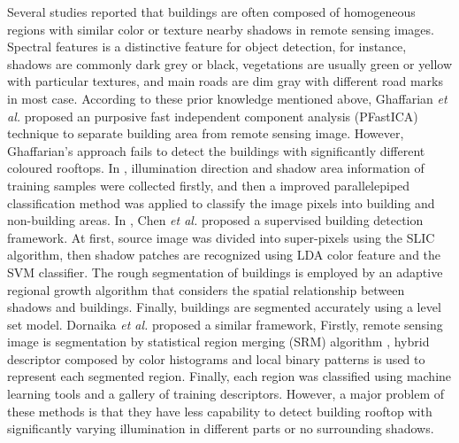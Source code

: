 \documentclass[runningheads]{llncs}
\begin{document}
	Several studies reported that buildings are often composed of homogeneous regions with similar color or texture nearby shadows in remote sensing images. Spectral features is a distinctive feature for object detection, for instance, shadows are commonly dark grey or black, vegetations are usually green or yellow with particular textures, and main roads are dim gray with different road marks in most case. According to these prior knowledge mentioned above, Ghaffarian \textit{et al.}  \cite{ghaffarian2014automaticPFICA} proposed an purposive fast independent component analysis (PFastICA) technique to separate building area from remote sensing image. However, Ghaffarian's approach fails to detect the buildings with significantly different coloured rooftops. In \cite{ghaffarian2014automaticsupervised}, illumination direction and shadow area information of training samples were collected firstly, and then a improved parallelepiped classification method was applied to classify the image pixels into building and non-building areas. In \cite{chen2014shadow}, Chen \textit{et al.} proposed a supervised building detection framework. At first, source image was divided into super-pixels using the SLIC \cite{achanta2012slic} algorithm, then shadow patches are recognized using LDA color feature and the SVM classifier. The rough segmentation of buildings is employed by an adaptive regional growth algorithm that considers the spatial relationship between shadows and buildings. Finally, buildings are segmented accurately using a level set model. Dornaika \textit{et al.} \cite{dornaika2015object} proposed a similar framework,
Firstly, remote sensing image is segmentation  by statistical region merging (SRM) algorithm , hybrid descriptor composed by color histograms and local binary patterns is used to represent each segmented region. Finally, each region was classified using machine learning tools and a gallery of training descriptors. However, a major problem of these methods is that they have less capability to detect building rooftop with significantly varying illumination in different parts or no surrounding shadows.
\end{document}
